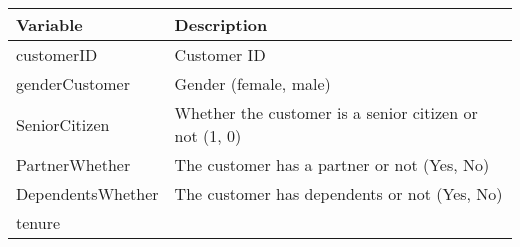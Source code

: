 \documentclass[]{article}
\begin{document}
\begin{longtable}[]{@{}ll@{}}
\toprule
\begin{minipage}[b]{0.22\columnwidth}\raggedright\strut
Variable\strut
\end{minipage} & \begin{minipage}[b]{0.72\columnwidth}\raggedright\strut
Description\strut
\end{minipage}\tabularnewline
\midrule
\endhead
\begin{minipage}[t]{0.22\columnwidth}\raggedright\strut
customerID\strut
\end{minipage} & \begin{minipage}[t]{0.72\columnwidth}\raggedright\strut
Customer ID\strut
\end{minipage}\tabularnewline
\begin{minipage}[t]{0.22\columnwidth}\raggedright\strut
genderCustomer\strut
\end{minipage} & \begin{minipage}[t]{0.72\columnwidth}\raggedright\strut
Gender (female, male)\strut
\end{minipage}\tabularnewline
\begin{minipage}[t]{0.22\columnwidth}\raggedright\strut
SeniorCitizen\strut
\end{minipage} & \begin{minipage}[t]{0.72\columnwidth}\raggedright\strut
Whether the customer is a senior citizen or not (1, 0)\strut
\end{minipage}\tabularnewline
\begin{minipage}[t]{0.22\columnwidth}\raggedright\strut
PartnerWhether\strut
\end{minipage} & \begin{minipage}[t]{0.72\columnwidth}\raggedright\strut
The customer has a partner or not (Yes, No)\strut
\end{minipage}\tabularnewline
\begin{minipage}[t]{0.22\columnwidth}\raggedright\strut
DependentsWhether\strut
\end{minipage} & \begin{minipage}[t]{0.72\columnwidth}\raggedright\strut
The customer has dependents or not (Yes, No)\strut
\end{minipage}\tabularnewline
\begin{minipage}[t]{0.22\columnwidth}\raggedright\strut
tenure\strut
\end{minipage} & \begin{minipage}[t]{0.72\columnwidth}\raggedright\strut

\end{minipage}
\end{longtable}
\end{document}
